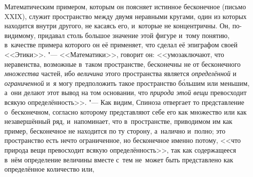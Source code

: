 Математическим примером, которым он поясняет истинное бесконечное (письмо
XXIX), служит пространство между двумя неравными кругами, один из которых
находится внутри другого, не касаясь его, и~которые не концентричны. Он,
по-видимому, придавал столь большое значение этой фигуре и~тому понятию,
в~качестве примера которого он её
применяет, что сделал её эпиграфом своей <<Этики>>. "--- <<Математики>>, говорит он: <<умозаключают, что
неравенства, возможные в~таком пространстве, бесконечны не от бесконечного
{\em множества} частей, ибо {\em величина} этого пространства является
{\em определённой} и {\em ограниченной} и~я могу предположить такое
пространство б\'{о}льшим или меньшим, а~они делают этот вывод на том основании,
что {\em природа этой вещи} превосходит всякую
определённость>>. "--- Как
видим, Спиноза отвергает то представление о~бесконечном, согласно которому
представляют себе его как множество или как незавершённый ряд, и~напоминает,
что в~пространстве, приводимом им как пример, бесконечное не находится по ту
сторону, а~налично и~полно; это пространство есть нечто ограниченное, но
бесконечное именно потому, <<что природа вещи превосходит всякую
определённость>>, так как содержащееся в~нём определение величины вместе с~тем
не~может быть представлено как определённое количество или,
